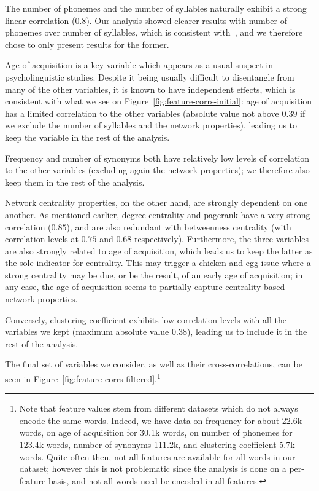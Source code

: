 The number of phonemes and the number of syllables naturally exhibit a strong linear correlation ($0.8$).
Our analysis showed clearer results with number of phonemes over number of syllables, which is consistent with~\citet{nick-diss}, and we therefore chose to only present results for the former.

Age of acquisition is a key variable which appears as a usual suspect in psycholinguistic studies.
Despite it being usually difficult to disentangle from many of the other variables, it is known to have independent effects, which is consistent with what we see on Figure~\ref{fig:feature-corrs-initial}: age of acquisition has a limited correlation to the other variables (absolute value not above $0.39$ if we exclude the number of syllables and the network properties), leading us to keep the variable in the rest of the analysis.

Frequency and number of synonyms both have relatively low levels of correlation to the other variables (excluding again the network properties); we therefore also keep them in the rest of the analysis.

\bigskip
Network centrality properties, on the other hand, are strongly dependent on one another.
As mentioned earlier, degree centrality and pagerank have a very strong correlation ($0.85$), and are also redundant with betweenness centrality (with correlation levels at $0.75$ and $0.68$ respectively).
Furthermore, the three variables are also strongly related to age of acquisition, which leads us to keep the latter as the sole indicator for centrality. This may trigger a chicken-and-egg issue where a strong centrality may be due, or be the result, of an early age of acquisition; in any case, the age of acquisition seems to partially capture centrality-based network properties.

Conversely, clustering coefficient exhibits low correlation levels with all the variables we kept (maximum absolute value $0.38$), leading us to include it in the rest of the analysis.

The final set of variables we consider, as well as their cross-correlations, can be seen in Figure~\ref{fig:feature-corrs-filtered}.\footnote{Note that feature values stem from different datasets which do not always encode the same words.
Indeed, we have data on frequency for about 22.6k words, on age of acquisition for 30.1k words, on number of phonemes for 123.4k words, number of synonyms 111.2k, and clustering coefficient 5.7k words.
Quite often then, not all features are available for all words in our dataset; %
however this is not problematic since the analysis is done on a per-feature basis, and not all words need be encoded in all features.}

